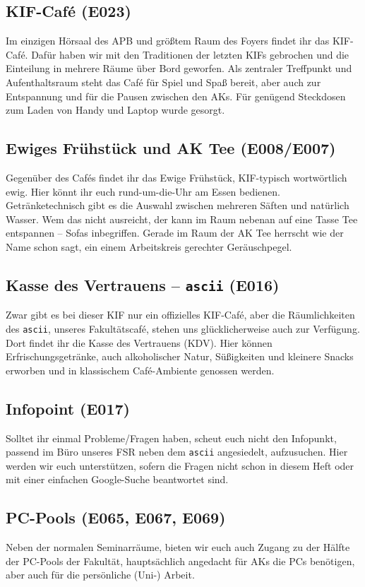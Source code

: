 \subsection*{KIF-Café (E023)}
Im einzigen Hörsaal des APB und größtem Raum des Foyers findet ihr das KIF-Café.
Dafür haben wir mit den Traditionen der letzten KIFs gebrochen und die Einteilung in mehrere Räume über Bord geworfen.
Als zentraler Treffpunkt und Aufenthaltsraum steht das Café für Spiel und Spaß bereit, aber auch zur Entspannung und für die Pausen zwischen den AKs.
Für genügend Steckdosen zum Laden von Handy und Laptop wurde gesorgt.

\subsection*{Ewiges Frühstück und AK Tee (E008/E007)}
Gegenüber des Cafés findet ihr das Ewige Frühstück, KIF-typisch wortwörtlich ewig.
Hier könnt ihr euch rund-um-die-Uhr am Essen bedienen.
Getränketechnisch gibt es die Auswahl zwischen mehreren Säften und natürlich Wasser.
Wem das nicht ausreicht, der kann im Raum nebenan auf eine Tasse Tee entspannen -- Sofas inbegriffen.
Gerade im Raum der AK Tee herrscht wie der Name schon sagt, ein einem Arbeitskreis gerechter Geräuschpegel.

\subsection*{Kasse des Vertrauens – \texttt{ascii} (E016)}
Zwar gibt es bei dieser KIF nur ein offizielles KIF-Café, aber die Räumlichkeiten des \texttt{ascii}, unseres Fakultätscafé, stehen uns glücklicherweise auch zur Verfügung.
Dort findet ihr die Kasse des Vertrauens (KDV).
Hier können Erfrischungsgetränke, auch alkoholischer Natur, Süßigkeiten und kleinere Snacks erworben und in klassischem Café-Ambiente genossen werden.

\subsection*{Infopoint (E017)}
Solltet ihr einmal Probleme/Fragen haben, scheut euch nicht den Infopunkt, passend im Büro unseres FSR neben dem \texttt{ascii} angesiedelt, aufzusuchen.
Hier werden wir euch unterstützen, sofern die Fragen nicht schon in diesem Heft oder mit einer einfachen Google-Suche beantwortet sind.

\subsection*{PC-Pools (E065, E067, E069)}
Neben der normalen Seminarräume, bieten wir euch auch Zugang zu der Hälfte der PC-Pools der Fakultät, hauptsächlich angedacht für AKs die PCs benötigen, aber auch für die persönliche (Uni-) Arbeit.

